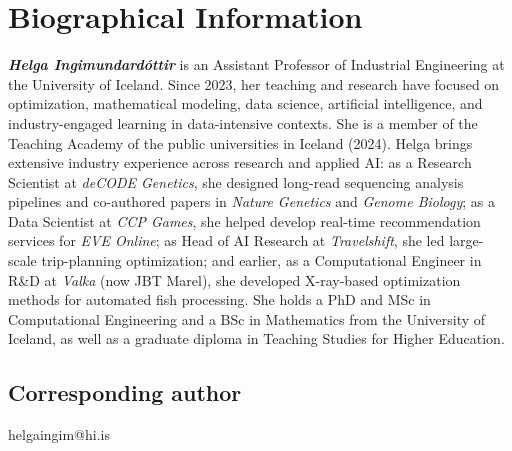 \documentclass[11pt]{cdio}
\begin{document}
\section{Biographical Information}
\textbf{\textit{Helga Ingimundardóttir}} is an Assistant Professor of Industrial Engineering at the University of Iceland. Since 2023, her teaching and research have focused on optimization, mathematical modeling, data science, artificial intelligence, and industry-engaged learning in data-intensive contexts. She is a member of the Teaching Academy of the public universities in Iceland (2024).
Helga brings extensive industry experience across research and applied AI: as a Research Scientist at \emph{deCODE Genetics}, she designed long-read sequencing analysis pipelines and co-authored papers in \emph{Nature Genetics} and \emph{Genome Biology}; as a Data Scientist at \emph{CCP Games}, she helped develop real-time recommendation services for \emph{EVE Online}; as Head of AI Research at \emph{Travelshift}, she led large-scale trip-planning optimization; and earlier, as a Computational Engineer in R\&D at \emph{Valka} (now JBT Marel), she developed X-ray-based optimization methods for automated fish processing.
She holds a PhD and MSc in Computational Engineering and a BSc in Mathematics from the University of Iceland, as well as a graduate diploma in Teaching Studies for Higher Education.

\subsection{Corresponding author}
{helgaingim@hi.is}
\end{document}
